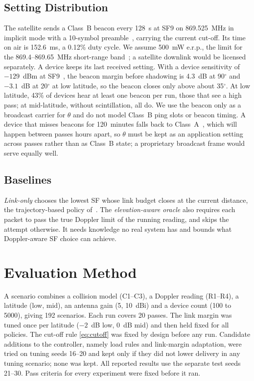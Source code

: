 \documentclass[journal]{IEEEtran}
\begin{document}
\subsection{Setting Distribution}
The satellite sends a Class~B beacon every 128~s at SF9 on 869.525~MHz in implicit mode with a 10-symbol preamble~\cite{lorawanL2,lorawanRP}, carrying the current cut-off. Its time on air is 152.6~ms, a 0.12\% duty cycle. We assume 500~mW e.r.p., the limit for the 869.4--869.65~MHz short-range band~\cite{erc7003}; a satellite downlink would be licensed separately. A device keeps its last received setting. With a device sensitivity of $-129$~dBm at SF9~\cite{sx1276}, the beacon margin before shadowing is 4.3~dB at 90$^\circ$ and $-3.1$~dB at 20$^\circ$ at low latitude, so the beacon closes only above about 35$^\circ$. At low latitude, 43\% of devices hear at least one beacon per run, those that see a high pass; at mid-latitude, without scintillation, all do. We use the beacon only as a broadcast carrier for $\theta$ and do not model Class~B ping slots or beacon timing. A device that misses beacons for 120~minutes falls back to Class~A~\cite{lorawanL2}, which will happen between passes hours apart, so $\theta$ must be kept as an application setting across passes rather than as Class~B state; a proprietary broadcast frame would serve equally well.

\subsection{Baselines}
\emph{Link-only} chooses the lowest SF whose link budget closes at the current distance, the trajectory-based policy of~\cite{alvarez2022}. The \emph{elevation-aware oracle} also requires each packet to pass the true Doppler limit of the running reading, and skips the attempt otherwise. It needs knowledge no real system has and bounds what Doppler-aware SF choice can achieve.

\section{Evaluation Method}\label{sec:method}
A scenario combines a collision model (C1--C3), a Doppler reading (R1--R4), a latitude (low, mid), an antenna gain (5, 10~dBi) and a device count (100 to 5000), giving 192 scenarios. Each run covers 20 passes. The link margin was tuned once per latitude ($-2$~dB low, 0~dB mid) and then held fixed for all policies. The cut-off rule \eqref{eq:cutoff} was fixed by design before any run. Candidate additions to the controller, namely load rules and link-margin adaptation, were tried on tuning seeds 16--20 and kept only if they did not lower delivery in any tuning scenario; none was kept. All reported results use the separate test seeds 21--30. Pass criteria for every experiment were fixed before it ran.
\end{document}

